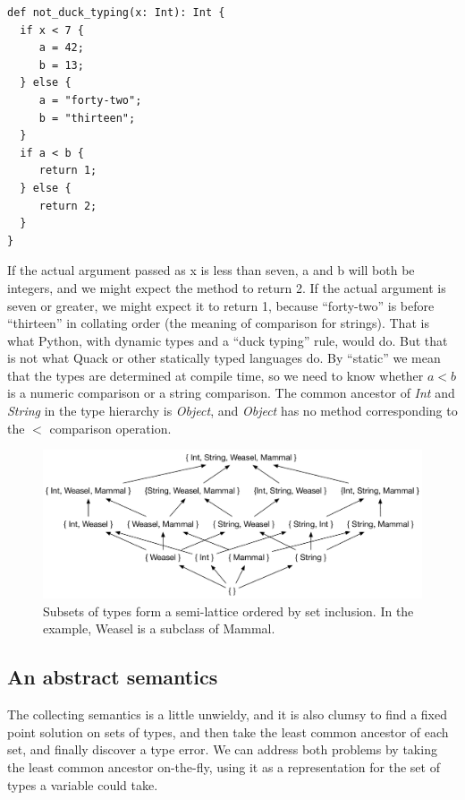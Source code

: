 \documentclass[11pt]{article}
\begin{document}
\begin{verbatim}
def not_duck_typing(x: Int): Int {
  if x < 7 {
     a = 42; 
     b = 13; 
  } else {
     a = "forty-two"; 
     b = "thirteen"; 
  }
  if a < b {
     return 1;
  } else {
     return 2; 
  }
}
\end{verbatim}

If the actual argument passed as x is less than seven, a and b will
both be integers, and we might expect the method to return 2.  If the
actual argument is seven or greater, we might expect it to return 1,
because ``forty-two'' is before ``thirteen'' in collating order (the
meaning of comparison for strings).   That is what Python, with
dynamic types and a ``duck typing'' rule, would do.  But that is not
what Quack or other statically typed languages do.  By ``static'' we
mean that the types are determined at compile time, so we need to know
whether \( a < b \) is a numeric comparison or a string comparison.
The common ancestor of \emph{Int} and \emph{String} in the type
hierarchy is \emph{Object}, and \emph{Object} has no method
corresponding to the $<$ comparison operation.  

\begin{figure}
\centerline{\includegraphics[scale=0.7]{img/Collecting-lattice.pdf}}
\caption{Subsets of types form a semi-lattice ordered by set
  inclusion.  In the example, Weasel is a subclass of Mammal.}
\label{fig-set-lattice}
\end{figure}

\subsection{An abstract semantics}

The collecting semantics is a little unwieldy, and it is also clumsy
to find a fixed point solution on sets of types, and then take the least
common ancestor of each set, and finally discover a type error.  We
can address both  problems by taking the least common ancestor
on-the-fly, using it as a representation for the set of types a
variable could take. 
\end{document}
